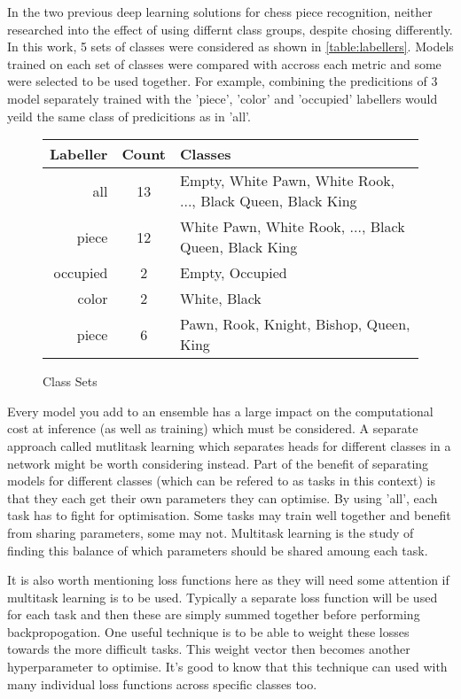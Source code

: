 In the two previous deep learning solutions for chess piece recognition, neither researched into the effect of using differnt class groups, 
despite chosing differently.
In this work, 5 sets of classes were considered as shown in \autoref{table:labellers}.  Models trained on each set of classes were compared
with accross each metric and some were selected to be used together.  For example, combining the predicitions of 3 model separately trained with
the 'piece', 'color' and 'occupied' labellers would yeild the same class of predicitions as in 'all'.
\begin{center}
\begin{figure}
\begin{tabular}{|r|c|l|}
    \hline
    Labeller & Count & Classes \\
    \hline
    all & 13 & Empty, White Pawn, White Rook, ..., Black Queen, Black King \\
    piece & 12 & White Pawn, White Rook, ..., Black Queen, Black King \\
    occupied & 2 & Empty, Occupied \\
    color & 2 & White, Black \\
    piece & 6 & Pawn, Rook, Knight, Bishop, Queen, King \\
    \hline
\end{tabular}
\caption{Class Sets}
\label{table:labellers}
\end{figure}
\end{center}

Every model you add to an ensemble has a large impact on the computational cost at inference (as well as training) which must be considered.  A separate
approach called mutlitask learning which separates heads for different classes in a network might be worth considering instead.  
Part of the benefit of separating models for different classes (which can be 
refered to as tasks in this context) is that they each get their own parameters they can optimise.  By using 'all', each task has to fight for optimisation.
Some tasks may train well together and benefit from sharing parameters, some may not.  Multitask learning is the study of finding this balance of which 
parameters should be shared amoung each task.

It is also worth mentioning loss functions here as they will need some attention if multitask learning is to be used.  Typically a separate loss function will be 
used for each task and then these are simply summed together before performing backpropogation.  One useful technique is to be able to weight these losses towards 
the more difficult tasks.  This weight vector then becomes another hyperparameter to optimise.  It's good to know that this technique can used with many 
individual loss functions across specific classes too.

